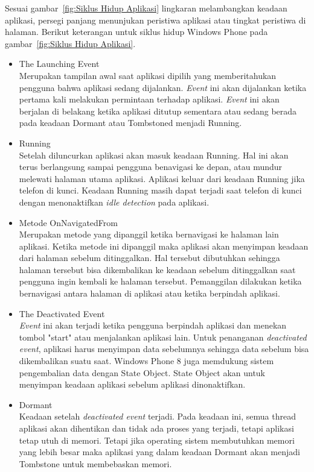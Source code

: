 Sesuai gambar~\ref{fig:Siklus Hidup Aplikasi} lingkaran melambangkan keadaan aplikasi, persegi panjang menunjukan peristiwa aplikasi atau tingkat peristiwa di halaman. Berikut keterangan untuk siklus hidup Windows Phone pada gambar~\ref{fig:Siklus Hidup Aplikasi}. 
\begin{itemize}
	\item The Launching Event \\
	Merupakan tampilan awal saat aplikasi dipilih yang memberitahukan pengguna bahwa aplikasi sedang dijalankan. \textit{Event} ini akan dijalankan ketika pertama kali melakukan permintaan terhadap aplikasi. \textit{Event} ini akan berjalan di belakang ketika aplikasi ditutup sementara atau sedang berada pada keadaan Dormant atau Tombstoned menjadi Running.
	\item Running \\
	Setelah diluncurkan aplikasi akan masuk keadaan Running. Hal ini akan terus berlangsung sampai pengguna benavigasi ke depan, atau mundur melewati halaman utama aplikasi. Aplikasi keluar dari keadaan Running jika telefon di kunci. Keadaan Running masih dapat terjadi saat telefon di kunci dengan menonaktifkan \textit{idle detection} pada aplikasi.
	\item Metode OnNavigatedFrom \\
	Merupakan metode yang dipanggil ketika bernavigasi ke halaman lain aplikasi. Ketika metode ini dipanggil maka aplikasi akan menyimpan keadaan dari halaman sebelum ditinggalkan. Hal tersebut dibutuhkan sehingga halaman tersebut bisa dikembalikan ke keadaan sebelum ditinggalkan saat pengguna ingin kembali ke halaman tersebut.  Pemanggilan dilakukan ketika bernavigasi antara halaman di aplikasi atau ketika berpindah aplikasi.
	\item The Deactivated Event \\
	\textit{Event} ini akan terjadi ketika pengguna berpindah aplikasi dan menekan tombol "start" atau menjalankan aplikasi lain. Untuk penanganan \textit{deactivated event}, aplikasi harus menyimpan data sebelumnya sehingga data sebelum bisa dikembalikan suatu saat. Windows Phone 8 juga memdukung sistem pengembalian data dengan State Object. State Object akan untuk menyimpan keadaan aplikasi sebelum aplikasi dinonaktifkan. 
	\item Dormant \\
	Keadaan setelah \textit{deactivated event} terjadi. Pada keadaan ini, semua thread aplikasi akan dihentikan dan tidak ada proses yang terjadi, tetapi aplikasi tetap utuh di memori. Tetapi jika operating sistem membutuhkan memori yang lebih besar maka aplikasi yang dalam keadaan Dormant akan menjadi Tombstone untuk membebaskan memori.

\end{itemize}
